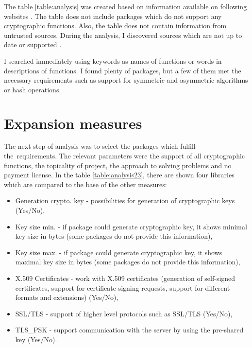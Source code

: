 \documentclass[
  twoside, 12pt, 
  printed, %
  notable,   %
  lof,     %
  lot,     %
]{fithesis3}
\begin{document}
The table \ref{table:analysis} was created based on information available on 
following websites \cite{security-golibrariesAndApps} \cite{cryptography-golibrariesAndApps} 
\cite{crypto-godoc} \cite{packages-thegoprogramminglanguage}. The 
table does not include packages which do not support any cryptographic functions. Also, 
the table does not contain information from untrusted sources. During the analysis, I 
discovered sources which are not up to date or supported \cite{puregolibs}. 

I searched immediately using keywords as names of functions or words in descriptions of functions. 
I found plenty of packages, but a few of them met the necessary requirements such as 
support for symmetric and asymmetric algorithms or hash operations. 

\section{Expansion measures}

The next step of analysis was to select the packages which fulfill the~requirements. The relevant 
parameters were the support of all cryptographic functions, the topicality of project, the 
approach to solving problems and no payment license. In the table \ref{table:analysis23}, 
there are shown four libraries which are compared to the base of the other measures:
\vskip0.1in
\begin{itemize}[leftmargin=2em,rightmargin=1em,itemsep=0.75\parskip,parsep=0em,topsep=0em,partopsep=0em]
\item Generation crypto. key - possibilities for generation of cryptographic keys (Yes/No),
\item Key size min. - if package could generate cryptographic key, it shows minimal key size in bytes (some packages do not provide this information),
\item Key size max. - if package could generate cryptographic key, it shows maximal key size in bytes (some packages do not provide this information),
\item X.509 Certificates - work with X.509 certificates (generation of self-signed certificates, support for certificate signing requests, support for different formats and extensions) (Yes/No),
\item SSL/TLS - support of higher level protocols such as SSL/TLS (Yes/No),
\item TLS\_PSK - support communication with the server by using the pre-shared key (Yes/No).
\end{itemize}
\vskip0.1in
\end{document}
